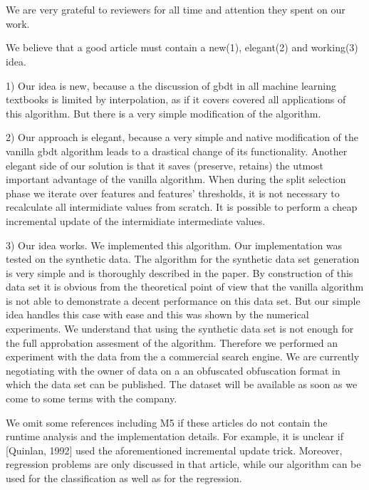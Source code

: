 \documentclass[a4paper,12pt]{extarticle}
\begin{document}
\section{}

We are very grateful to reviewers for all {\color{red} time} and attention they spent on our work.

We believe that a good article must contain a new(1), elegant(2) and working(3) idea.

1) Our idea is new, because {\color{red}a} the discussion of gbdt in all machine learning textbooks is limited by interpolation, as if it {\color{red}covers} covered all applications of this algorithm.
But there is a very simple modification of the algorithm.

2) Our approach is elegant, because a very simple and native modification of the vanilla gbdt algorithm leads to a drastical change of its functionality.
Another elegant side of our solution is that it {\color{red}saves} (preserve, retains) the utmost important advantage of the vanilla algorithm.
When during the split selection phase we iterate over features and features' thresholds,
it is not necessary to recalculate all intermidiate values from scratch.
It is possible to perform a cheap incremental update of the {\color{red}intermidiate} intermediate values.

3) Our idea works.
We implemented this algorithm.
Our implementation was tested on the synthetic data.
The algorithm for the synthetic {\color{red}data set} generation is very simple and is thoroughly described in the paper.
By construction of this {\color{red} data set} it is obvious {\color{blue}from the theoretical point  of view} that the vanilla algorithm is not able to demonstrate a decent performance on this data set.
But our simple idea handles this case with ease and this was shown by the numerical experiments.
We understand that using the synthetic data set is not enough for the full {\color{red}approbation} assesment of the algorithm.
Therefore we performed an experiment with the data from {\color{red}the} a commercial search engine.
We are currently negotiating with the owner of data on {\color{red}a} an {\color{red}obfuscated} obfuscation format in which {\color{red} the} data set can be published. The dataset will be available as soon as we come to some terms with the company.
 
We omit some references including M5 if these articles do not contain {\color{red} the} runtime analysis and {\color{red} the} implementation details.
For example, it is unclear if [Quinlan, 1992] used {\color{red} the} aforementioned incremental update trick.
Moreover, regression problems are only discussed in that article, while our algorithm can be used for the classification as well as for the regression.
\end{document}
